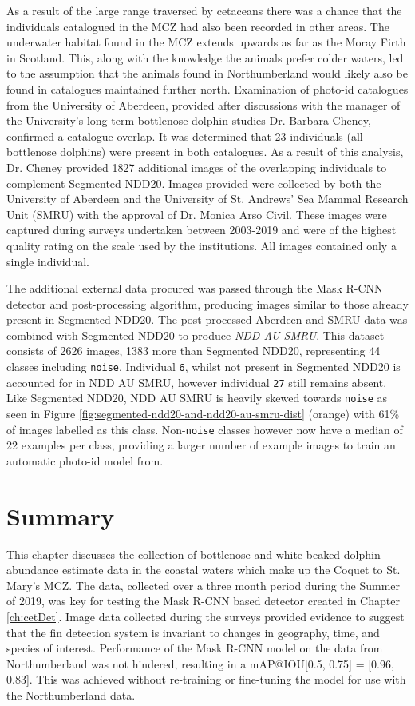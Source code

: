 As a result of the large range traversed by cetaceans \cite{shane_ecology_1986} there was a chance that the individuals catalogued in the MCZ had also been recorded in other areas. The underwater habitat found in the MCZ extends upwards as far as the Moray Firth in Scotland. This, along with the knowledge the animals prefer colder waters, led to the assumption that the animals found in Northumberland would likely also be found in catalogues maintained further north. Examination of photo-id catalogues from the University of Aberdeen, provided after discussions with the manager of the University's long-term bottlenose dolphin studies Dr. Barbara Cheney, confirmed a catalogue overlap. It was determined that 23 individuals (all bottlenose dolphins) were present in both catalogues. As a result of this analysis, Dr. Cheney provided 1827 additional images of the overlapping individuals to complement Segmented NDD20. Images provided were collected by both the University of Aberdeen and the University of St. Andrews' Sea Mammal Research Unit (SMRU) with the approval of Dr. Monica Arso Civil. These images were captured during surveys undertaken between 2003-2019 and were of the highest quality rating on the scale used by the institutions. All images contained only a single individual. 

The additional external data procured was passed through the Mask R-CNN detector and post-processing algorithm, producing images similar to those already present in Segmented NDD20. The post-processed Aberdeen and SMRU data was combined with Segmented NDD20 to produce \textit{NDD AU SMRU}. This dataset consists of 2626 images, 1383 more than Segmented NDD20, representing 44 classes including \texttt{noise}. Individual \texttt{6}, whilst not present in Segmented NDD20 is accounted for in NDD AU SMRU, however individual \texttt{27} still remains absent. Like Segmented NDD20, NDD AU SMRU is heavily skewed towards \texttt{noise} as seen in Figure \ref{fig:segmented-ndd20-and-ndd20-au-smru-dist} (orange) with 61\% of images labelled as this class. Non-\texttt{noise} classes however now have a median of 22 examples per class, providing a larger number of example images to train an automatic photo-id model from. 

\section{Summary}\label{ch:NDD,sec:summary}

This chapter discusses the collection of bottlenose and white-beaked dolphin abundance estimate data in the coastal waters which make up the Coquet to St. Mary's MCZ. The data, collected over a three month period during the Summer of 2019, was key for testing the Mask R-CNN based detector created in Chapter \ref{ch:cetDet}. Image data collected during the surveys provided evidence to suggest that the fin detection system is invariant to changes in geography, time, and species of interest. Performance of the Mask R-CNN model on the data from Northumberland was not hindered, resulting in a mAP@IOU[0.5, 0.75] = [0.96, 0.83]. This was achieved without re-training or fine-tuning the model for use with the Northumberland data. 

